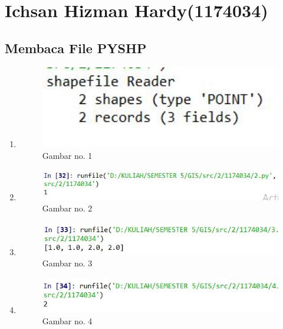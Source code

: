 \section{Ichsan Hizman Hardy(1174034)}
\subsection{Membaca File PYSHP}
\begin{enumerate}
	\item 
	
	\begin{figure}[H]
		\includegraphics[width=12cm]{figures/1174034/tugas3/1.PNG}
		\centering
		\caption{Gambar no. 1}
	\end{figure}
	
	\item 
	
	\begin{figure}[H]
		\includegraphics[width=12cm]{figures/1174034/tugas3/2.PNG}
		\centering
		\caption{Gambar no. 2}
	\end{figure}
	
	\item 
	
	\begin{figure}[H]
		\includegraphics[width=12cm]{figures/1174034/tugas3/3.PNG}
		\centering
		\caption{Gambar no. 3}
	\end{figure}
	
	\item 
	
	\begin{figure}[H]
		\includegraphics[width=12cm]{figures/1174034/tugas3/4.PNG}
		\centering
		\caption{Gambar no. 4}
	\end{figure}
	

\end{enumerate}
